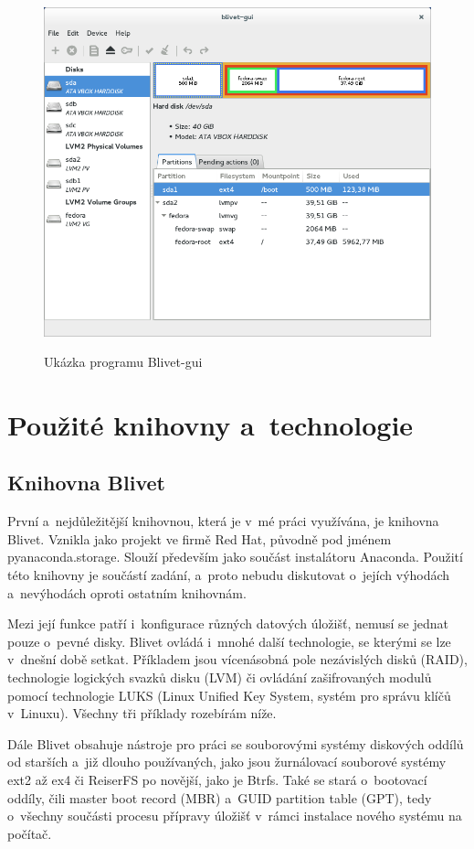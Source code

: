 \documentclass[printed,color,table,oneside,nolot,nolof]{fithesis}
\begin{document}
 \begin{figure}[h]
	 \label{fig:blivet}
	 \caption{Ukázka programu Blivet-gui~\cite{blivet-gui}}
	 \centering
	 \includegraphics[width=.8\columnwidth]{pictures/blivet-gui-1.png}\\
 \end{figure}

\chapter{Použité knihovny a~technologie}
\section{Knihovna Blivet}
	První a~nejdůležitější knihovnou, která je v~mé práci využívána, je knihovna Blivet. Vznikla jako projekt
	ve firmě Red Hat, původně pod jménem pyanaconda.storage\cite{blivet}. Slouží především jako součást instalátoru Anaconda. Použití této knihovny je součástí zadání, 
	a~proto nebudu diskutovat o~jejích výhodách a~nevýhodách oproti ostatním knihovnám. 

	Mezi její funkce patří i~konfigurace různých datových úložišť, nemusí se jednat pouze o~pevné disky.
	Blivet ovládá i~mnohé další technologie, se kterými se lze v~dnešní době setkat. Příkladem jsou vícenásobná pole nezávislých disků (RAID), technologie logických svazků disku (LVM) či 
	ovládání zašifrovaných modulů pomocí technologie LUKS (Linux Unified Key System, systém pro správu klíčů v~Linuxu). Všechny tři příklady rozebírám níže.

	Dále Blivet obsahuje nástroje pro práci se souborovými systémy diskových oddílů od starších a~již dlouho používaných, jako jsou žurnálovací souborové systémy ext2 až ex4 či ReiserFS\cite{journalFS}  po novější, jako je Btrfs. Také se stará o~bootovací oddíly, čili master boot record (MBR) a~GUID partition table (GPT), tedy o~všechny součásti procesu přípravy úložišť v~rámci instalace nového systému na počítač.
\end{document}
